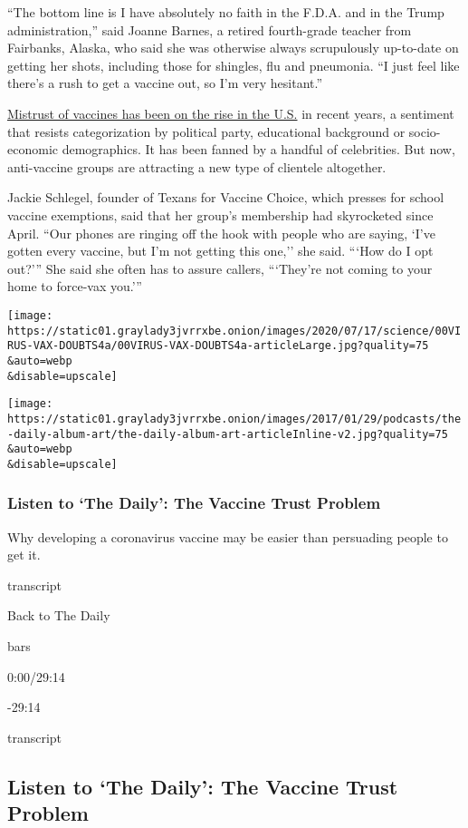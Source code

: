 ``The bottom line is I have absolutely no faith in the F.D.A. and in the
Trump administration,'' said Joanne Barnes, a retired fourth-grade
teacher from Fairbanks, Alaska, who said she was otherwise always
scrupulously up-to-date on getting her shots, including those for
shingles, flu and pneumonia. ``I just feel like there's a rush to get a
vaccine out, so I'm very hesitant.''

\href{https://www.nytimes3xbfgragh.onion/2019/09/23/health/anti-vaccination-movement-us.html}{Mistrust
of vaccines has been on the rise in the U.S.} in recent years, a
sentiment that resists categorization by political party, educational
background or socio-economic demographics. It has been fanned by a
handful of celebrities. But now, anti-vaccine groups are attracting a
new type of clientele altogether.

Jackie Schlegel, founder of Texans for Vaccine Choice, which presses for
school vaccine exemptions, said that her group's membership had
skyrocketed since April. ``Our phones are ringing off the hook with
people who are saying, `I've gotten every vaccine, but I'm not getting
this one,'' she said. ```How do I opt out?''' She said she often has to
assure callers, ```They're not coming to your home to force-vax you.'''

\texttt{[image: https://static01.graylady3jvrrxbe.onion/images/2020/07/17/science/00VIRUS-VAX-DOUBTS4a/00VIRUS-VAX-DOUBTS4a-articleLarge.jpg?quality=75\\\&auto=webp\\\&disable=upscale]}

\texttt{[image: https://static01.graylady3jvrrxbe.onion/images/2017/01/29/podcasts/the-daily-album-art/the-daily-album-art-articleInline-v2.jpg?quality=75\\\&auto=webp\\\&disable=upscale]}

\hypertarget{listen-to-the-daily-the-vaccine-trust-problem}{%
\subsubsection{Listen to `The Daily': The Vaccine Trust
Problem}\label{listen-to-the-daily-the-vaccine-trust-problem}}

Why developing a coronavirus vaccine may be easier than persuading
people to get it.

transcript

Back to The Daily

bars

0:00/29:14

-29:14

transcript

\hypertarget{listen-to-the-daily-the-vaccine-trust-problem-1}{%
\subsection{Listen to `The Daily': The Vaccine Trust
Problem}\label{listen-to-the-daily-the-vaccine-trust-problem-1}}

